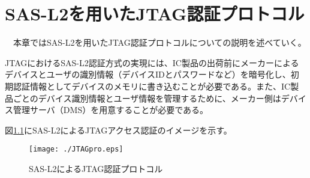 \documentclass{thesis}
\begin{document}
\chapter{SAS-L2を用いたJTAG認証プロトコル}
　本章ではSAS-L2を用いたJTAG認証プロトコルについての説明を述べていく。\par
JTAGにおけるSAS-L2認証方式の実現には、IC製品の出荷前にメーカーによるデバイスとユーザの識別情報（デバイスIDとパスワードなど）を暗号化し、初期認証情報としてデバイスのメモリに書き込むことが必要である。また、IC製品ごとのデバイス識別情報とユーザ情報を管理するために、メーカー側はデバイス管理サーバ（DMS）を用意することが必要である。\par
図\ref{JTAGpro}にSAS-L2によるJTAGアクセス認証のイメージを示す。
\begin{figure}[H]
 \center
 \texttt{[image: ./JTAGpro.eps]}
 \caption{SAS-L2によるJTAG認証プロトコル}
 \label{JTAGpro}
\end{figure}
\end{document}
